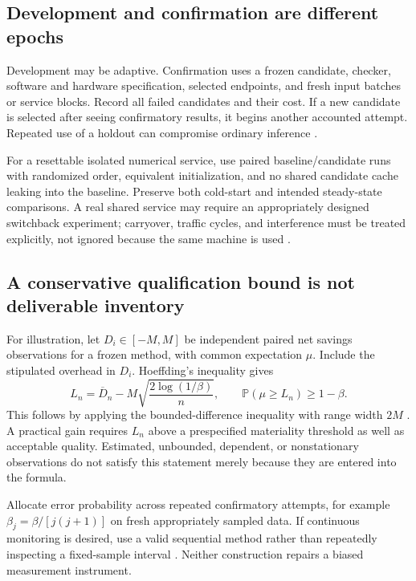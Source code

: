 \documentclass[11pt,letterpaper]{article}
\newcommand{\Prob}{\mathbb P}\newcommand{\J}{\mathcal J}\newcommand{\1}{\mathbf 1}
\theoremstyle{remark}\newtheorem{remark}{Remark}[section]
\begin{document}
\subsection{Development and confirmation are different epochs}
Development may be adaptive. Confirmation uses a frozen candidate, checker, software and hardware specification, selected endpoints, and fresh input batches or service blocks. Record all failed candidates and their cost. If a new candidate is selected after seeing confirmatory results, it begins another accounted attempt. Repeated use of a holdout can compromise ordinary inference \citep{dwork}.

For a resettable isolated numerical service, use paired baseline/candidate runs with randomized order, equivalent initialization, and no shared candidate cache leaking into the baseline. Preserve both cold-start and intended steady-state comparisons. A real shared service may require an appropriately designed switchback experiment; carryover, traffic cycles, and interference must be treated explicitly, not ignored because the same machine is used \citep{switchback}.

\subsection{A conservative qualification bound is not deliverable inventory}
For illustration, let $D_i\in[-M,M]$ be independent paired net savings observations for a frozen method, with common expectation $\mu$. Include the stipulated overhead in $D_i$. Hoeffding's inequality gives
\begin{equation}\label{eq:lcb}
L_n=\overline D_n-M\sqrt{\frac{2\log(1/\beta)}{n}},\qquad
\Prob(\mu\ge L_n)\ge1-\beta.
\end{equation}
This follows by applying the bounded-difference inequality with range width $2M$ \citep{hoeffding}. A practical gain requires $L_n$ above a prespecified materiality threshold as well as acceptable quality. Estimated, unbounded, dependent, or nonstationary observations do not satisfy this statement merely because they are entered into the formula.

Allocate error probability across repeated confirmatory attempts, for example $\beta_j=\beta/[j(j+1)]$ on fresh appropriately sampled data. If continuous monitoring is desired, use a valid sequential method rather than repeatedly inspecting a fixed-sample interval \citep{howard}. Neither construction repairs a biased measurement instrument.
\end{document}
